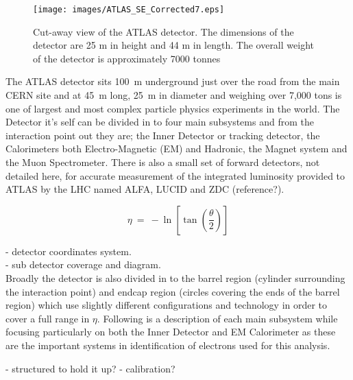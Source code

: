 	\begin{figure}[h]
		\begin{center}
			\texttt{[image: images/ATLAS\_SE\_Corrected7.eps]}
		\end{center}
		\caption{Cut-away view of the ATLAS detector. The dimensions of the detector are 25 m in height and 44 m in length. The overall weight of the detector is approximately 7000 tonnes}
		\label{fig:ATLAS_cutaway}
	\end{figure}



	The ATLAS detector sits \SI{100}{\m} underground just over the road from the main CERN site and at \SI{45}{\m} long, \SI{25}{\m} in diameter and weighing over 7,000 tons is one of largest and most complex particle physics experiments in the world. The Detector it's self can be divided in to four main subsystems and from the interaction point out they are; the Inner Detector or tracking detector, the Calorimeters both Electro-Magnetic (EM) and Hadronic, the Magnet system and the Muon Spectrometer. There is also a small set of forward detectors, not detailed here, for accurate measurement of the integrated luminosity provided to ATLAS by the LHC named ALFA, LUCID and ZDC (reference?). 

	\begin{equation}
		\eta~=~-\ln[\tan(\frac{\theta}{2})]
	\end{equation}

	- detector coordinates system.\\
	- sub detector coverage and diagram.\\

	Broadly the detector is also divided in to the barrel region (cylinder surrounding the interaction point) and endcap region (circles covering the ends of the barrel region) which use slightly different configurations and technology in order to cover a full range in $\eta$.
	Following is a description of each main subsystem while focusing particularly on both the Inner Detector and EM Calorimeter as these are the important systems in identification of electrons used for this analysis.


	- structured to hold it up?
	- calibration?

